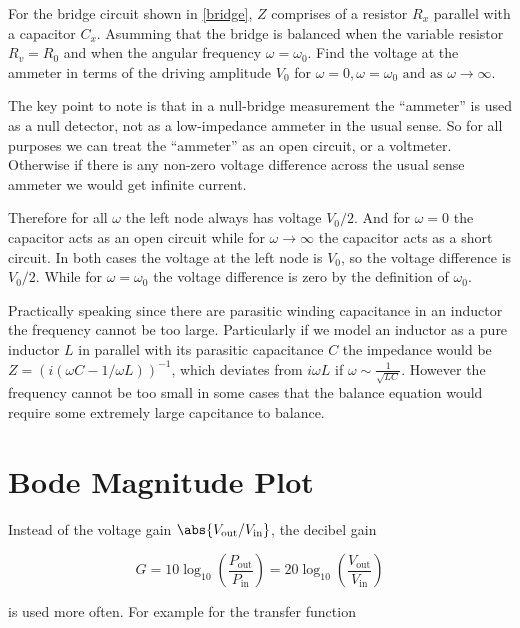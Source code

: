\documentclass[english,a4paper,12pt]{report}
\begin{document}
{For the bridge circuit shown in \cref{bridge}, \(Z\) comprises of a resistor \(R_{x} \) parallel with a capacitor \(C_{x} \). Asumming that the bridge is balanced when the variable resistor \(R_{v} = R_{0} \) and when the angular frequency \(\omega = \omega _{0} \). Find the voltage at the ammeter in terms of the driving amplitude \(V_0 \) for \(\omega  = 0, \omega = \omega _{0}  \text { and as } \omega \to \infty \).        }
{The key point to note is that in a null-bridge measurement the ``ammeter'' is used as a null detector, not as a low-impedance ammeter in the usual sense. So for all purposes we can treat the ``ammeter'' as an open circuit, or a voltmeter. Otherwise if there is any non-zero voltage difference across the usual sense ammeter we would get infinite current.

Therefore for all \(\omega \) the left node always has voltage \(V_0 /2\). And for \(\omega = 0\) the capacitor acts as an open circuit while for \(\omega \to \infty\) the capacitor acts as a short circuit. In both cases the voltage at the left node is \(V_0 \), so the voltage difference is \(V_0 /2\). While for \(\omega = \omega _{0} \) the voltage difference is zero by the definition of \(\omega _{0} \).       } 


Practically speaking since there are parasitic winding capacitance in an inductor the frequency cannot be too large. Particularly if we model an inductor as a pure inductor \(L\) in parallel with its parasitic capacitance \(C\) the impedance would be \(Z = (i (\omega C - 1/\omega L))^{-1} \), which deviates from \(i \omega L\) if \(\omega \sim \frac{1}{\sqrt{LC} } \). However the frequency cannot be too small in some cases that the balance equation would require some extremely large capcitance to balance.   

\section{Bode Magnitude Plot}

Instead of the voltage gain \(\abs{V_{\text{out} }/V_{\text{in} } } \), the decibel gain 

\begin{equation}
    G = 10 \log _{10} \left( \frac{P_{\text{out} } }{P_{\text{in} } }  \right) = 20 \log _{10} \left( \frac{V_{\text{out} } }{V_{\text{in} } }  \right) 
\end{equation}

is used more often. For example for the transfer function 
\end{document}

